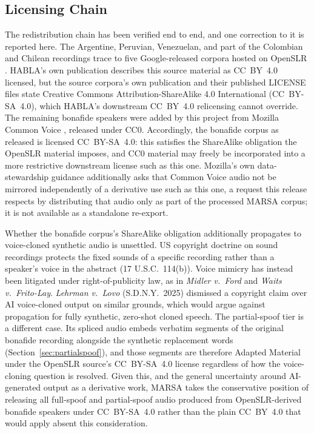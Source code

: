 \documentclass[11pt]{report}
\begin{document}
\subsection{Licensing Chain}

The redistribution chain has been verified end to end, and one
correction to it is reported here. The Argentine, Peruvian, Venezuelan,
and part of the Colombian and Chilean recordings trace to five
Google-released corpora hosted on OpenSLR
\citep{guevararukoz2020crowdsourcing}. HABLA's own publication
describes this source material as CC~BY~4.0 licensed, but the source
corpora's own publication and their published LICENSE files state
Creative Commons Attribution-ShareAlike 4.0 International
(CC~BY-SA~4.0), which HABLA's downstream CC~BY~4.0 relicensing cannot
override. The remaining bonafide speakers were added by this project
from Mozilla Common Voice \citep{commonvoice}, released under CC0.
Accordingly, the bonafide corpus as released is licensed CC~BY-SA~4.0:
this satisfies the ShareAlike obligation the OpenSLR material imposes,
and CC0 material may freely be incorporated into a more restrictive
downstream license such as this one. Mozilla's own data-stewardship
guidance additionally asks that Common Voice audio not be mirrored
independently of a derivative use such as this one, a request this
release respects by distributing that audio only as part of the
processed MARSA corpus; it is not available as a standalone re-export.

Whether the bonafide corpus's ShareAlike obligation additionally
propagates to voice-cloned synthetic audio is unsettled. US copyright
doctrine on sound recordings protects the fixed sounds of a specific
recording rather than a speaker's voice in the abstract (17 U.S.C.\
114(b)). Voice mimicry has instead been litigated under
right-of-publicity law, as in \textit{Midler v.\ Ford} and \textit{Waits
v.\ Frito-Lay}. \textit{Lehrman v.\ Lovo} (S.D.N.Y.\ 2025) dismissed
a copyright claim over AI voice-cloned output on similar grounds, which
would argue against propagation for fully synthetic, zero-shot cloned
speech. The partial-spoof tier is a different case. Its spliced audio
embeds verbatim segments of the original bonafide recording alongside
the synthetic replacement words (Section~\ref{sec:partialspoof}), and
those segments are therefore Adapted Material under the OpenSLR source's
CC~BY-SA~4.0 license regardless of how the voice-cloning question is
resolved. Given this, and the general uncertainty around AI-generated
output as a derivative work, MARSA takes the conservative position of
releasing all full-spoof and partial-spoof audio produced from
OpenSLR-derived bonafide speakers under CC~BY-SA~4.0 rather than the
plain CC~BY~4.0 that would apply absent this consideration.
\end{document}
